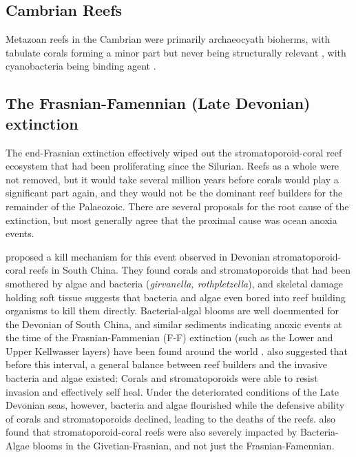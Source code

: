 \documentclass[11pt,a4paper]{article}
\begin{document}
\subsection{Cambrian Reefs}
Metazoan reefs in the Cambrian were primarily archaeocyath bioherms, with tabulate corals forming a minor part but never being structurally relevant \citep{Copper1994}, with cyanobacteria being  binding agent \citep{Lipps2016}. 

\subsection{The Frasnian-Famennian (Late Devonian) extinction}
The end-Frasnian extinction effectively wiped out the stromatoporoid-coral reef ecosystem that had been proliferating since the Silurian.
 Reefs as a whole were not removed, but it would take several million years before corals would play a significant part again, and they would not be the dominant reef builders for the remainder of the Palaeozoic. %
 There are several proposals for the root cause of the extinction, but most generally agree that the proximal cause was ocean anoxia events.

\cite{WuFengGong2013} proposed a kill mechanism for this event observed in Devonian stromatoporoid-coral reefs in South China.
 They found corals and stromatoporoids that had been smothered by algae and bacteria (\textit{girvanella, rothpletzella}), and skeletal damage holding soft tissue suggests that bacteria and algae even bored into reef building organisms to kill them directly.
  Bacterial-algal blooms are well documented for the Devonian of South China, and similar sediments indicating anoxic events at the time of the Frasnian-Fammenian (F-F) extinction (such as the Lower and Upper  Kellwasser layers) have been found around the world \citep{Bond2005, House1985, Joachimski2001, Wendt1991}.
\cite{WuFengGong2013} also suggested that before this interval, a general balance between reef builders and the invasive bacteria and algae existed: Corals and stromatoporoids were able to resist invasion and effectively self heal.
 Under the deteriorated conditions of the Late Devonian seas, however, bacteria and algae flourished while the defensive ability of corals and stromatoporoids declined, leading to the deaths of the reefs.
 \cite{WuFengGong2013} also found that stromatoporoid-coral reefs were also severely impacted by Bacteria-Algae blooms in the Givetian-Frasnian, and not just the Frasnian-Famennian.
\end{document}
